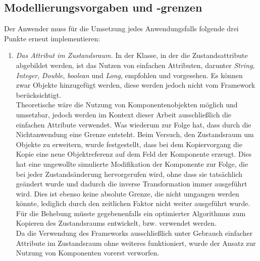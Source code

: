     \subsection{Modellierungsvorgaben und -grenzen}
    \label{subsec:modellierungsgrenzen}
        Der Anwender muss für die Umsetzung jedes Anwendungsfalls folgende drei Punkte erneut implementieren: 
        \begin{enumerate}
            \item \textit{Das Attribut im Zustandsraum.}
            In der Klasse, in der die Zustandsattribute abgebildet werden, ist das Nutzen von einfachen Attributen, darunter 
            \textit{String}, \textit{Integer}, \textit{Double}, \textit{boolean} und \textit{Long}, empfohlen und vorgesehen. Es können 
            zwar Objekte hinzugefügt werden, diese werden jedoch nicht vom Framework berücksichtigt. 
            \\
            Theoretische wäre die Nutzung von Komponentenobjekten möglich und umsetzbar, jedoch werden im Kontext dieser Arbeit ausschließlich die einfachen Attribute verwendet. Was wiederum zur Folge hat, dass 
            durch die Nichtanwendung eine Grenze entsteht. Beim Versuch, den Zustandsraum um Objekte zu erweitern, wurde festgestellt, dass bei dem Kopiervorgang die Kopie eine neue Objektreferenz 
            auf dem Feld der Komponente erzeugt. Dies hat eine ungewollte simulierte Modifikation der Komponente zur Folge, die bei jeder Zustandsänderung hervorgerufen wird, ohne dass sie tatsächlich geändert wurde und 
            dadurch die inverse Transformation immer ausgeführt wird. 
            Dies ist ebenso keine absolute Grenze, die nicht umgangen werden könnte, lediglich durch den zeitlichen Faktor nicht weiter ausgeführt wurde. Für die Behebung müsste gegebenenfalls ein optimierter 
            Algorithmus zum Kopieren des Zustandsraums entwickelt, bzw. verwendet werden. 
            \\
            Da die Verwendung des Frameworks ausschließlich unter Gebrauch einfacher Attribute im Zustandsraum ohne weiteres funktioniert, wurde der Ansatz zur Nutzung von Komponenten vorerst verworfen.  
            

\end{enumerate}

